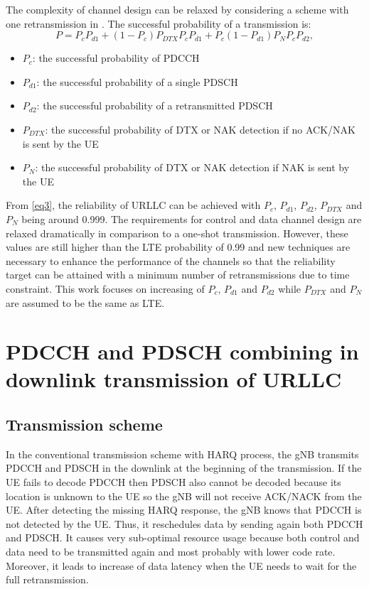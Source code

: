 \documentclass[conference,10pt]{IEEEtran}
\begin{document}
The complexity of channel design can be relaxed by considering a scheme with one retransmission in \cite{b7}. The successful probability of a transmission is:
\begin{equation}
P = P_{c}P_{d1} + (1-P_{c})P_{DTX}P_{c}P_{d1} + P_{c}(1-P_{d1})P_{N}P_{c}P_{d2},\label{eq3}
\end{equation}
\begin{itemize}
    \item $P_{c}$: the successful probability of PDCCH
    \item $P_{d1}$: the successful probability of a single PDSCH
    \item $P_{d2}$: the successful probability of a retransmitted PDSCH
    \item $P_{DTX}$: the successful probability of DTX or NAK detection if no ACK/NAK is sent by the UE
    \item $P_{N}$: the successful probability of DTX or NAK detection if NAK is sent by the UE
\end{itemize}

From \eqref{eq3}, the reliability of URLLC can be achieved with $P_{c}$, $P_{d1}$, $P_{d2}$, $P_{DTX}$ and $P_{N}$ being around 0.999. The requirements for control and data channel design are relaxed dramatically in comparison to a one-shot transmission. However, these values are still higher than the LTE probability of 0.99 and new techniques are necessary to enhance the performance of the channels so that the reliability target can be attained with a minimum number of retransmissions due to time constraint. This work focuses on increasing of $P_{c}$, $P_{d1}$ and $P_{d2}$ while $P_{DTX}$ and $P_{N}$ are assumed to be the same as LTE.

\section{PDCCH and PDSCH combining in downlink transmission of URLLC}

\subsection{Transmission scheme}\label{AA}
In the conventional transmission scheme with HARQ process, the gNB transmits PDCCH and PDSCH in the downlink at the beginning of the transmission. If the UE fails to decode PDCCH then PDSCH also cannot be decoded because its location is unknown to the UE so the gNB will not receive ACK/NACK from the UE. After detecting the missing HARQ response, the gNB knows that PDCCH is not detected by the UE. Thus, it reschedules data by sending again both PDCCH and PDSCH. It causes very sub-optimal resource usage because both control and data need to be transmitted again and most probably with lower code rate. Moreover, it leads to increase of data latency when the UE needs to wait for the full retransmission.
\end{document}
